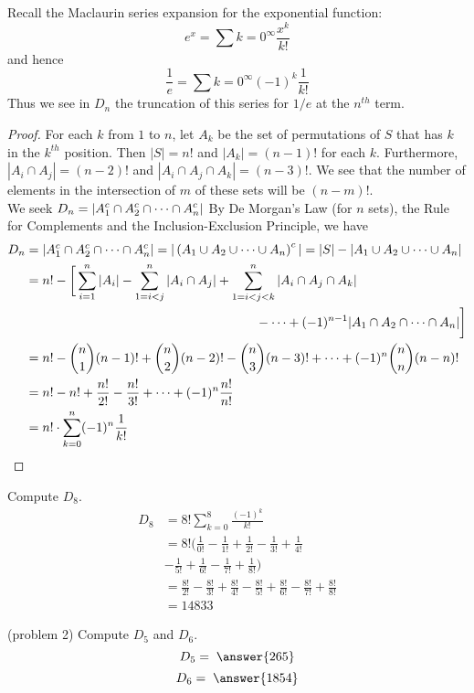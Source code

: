\documentclass[handout]{ximera}
\begin{document}
\begin{remark}
Recall the Maclaurin series expansion for the exponential function:
\[
e^x = \sum{k = 0}^\infty \frac{x^k}{k!}
\]
and hence
\[
\frac{1}{e} = \sum{k = 0}^\infty (-1)^k\frac{1}{k!}
\]
Thus we see in $D_n$ the truncation of this series for $1/e$ at the $n^{th}$ term.
\end{remark}

\begin{proof}
For each $k$ from $1$ to $n$, let $A_k$ be the set of permutations of $S$ that has $k$ in the $k^{th}$ position.
Then $|S| = n!$ and $|A_k| = (n-1)!$ for each $k$. Furthermore, $|A_i \cap A_j| = (n-2)!$ and $|A_i \cap A_j \cap A_k| = (n-3)!$.
We see that the number of elements in the intersection of $m$ of these sets will be $(n-m)!$.\\
We seek $\displaystyle D_n = |A_1^c \cap A_2^c \cap \cdots \cap A_n^c|$
By De Morgan's Law (for $n$ sets), the Rule for Complements and the Inclusion-Exclusion Principle, we have
\begin{align*}
D_n &= |A_1^c \cap A_2^c \cap \cdots \cap A_n^c| = |\left(A_1 \cup A_2 \cup \cdots \cup A_n\right)^c|
   = |S| - |A_1 \cup A_2 \cup \cdots \cup A_n|\\
   &= n! - \bigg[\sum_{i =1}^n |A_i| - \sum_{1 =i<j}^n |A_i\cap A_j|+ 
   \sum_{1 =i<j< k}^n |A_i\cap A_j \cap A_k| \\
   &\hspace{2.5 in} - \cdots + (-1)^{n-1} |A_1 \cap A_2 \cap \cdots \cap A_n|\bigg]\\
   &= n! - \binom{n}{1}(n-1)! + \binom{n}{2}(n-2)! - \binom{n}{3}(n-3)! + \cdots + (-1)^n \binom{n}{n}(n-n)!\\
   &= n! - n! + \frac{n!}{2!} - \frac{n!}{3!} + \cdots + (-1)^n \frac{n!}{n!}\\
   &= n! \cdot \sum_{k=0}^n (-1)^n \frac{1}{k!}
\end{align*}


\end{proof}

\begin{example}[example 2]
Compute $D_8$.\\
\begin{align*}
D_8 &= 8! \sum_{k=0}^8 \frac{(-1)^k}{k!}\\
&= 8!\big(\frac{1}{0!} - \frac{1}{1!} + \frac{1}{2!} - \frac{1}{3!} + \frac{1}{4!} \\
& - \frac{1}{5!} + \frac{1}{6!} - \frac{1}{7!} + \frac{1}{8!}\big) \\
&=  \frac{8!}{2!} - \frac{8!}{3!} + \frac{8!}{4!} - \frac{8!}{5!} + \frac{8!}{6!} - \frac{8!}{7!} + \frac{8!}{8!} \\
&= 14833
\end{align*}
\end{example}

\begin{problem}(problem 2)
Compute $D_5$ and $D_6$.\\
\[
D_5 = \; \answer{265}
\]
\[
D_6 = \; \answer{1854}
\]
\end{problem}

 
\end{document}
